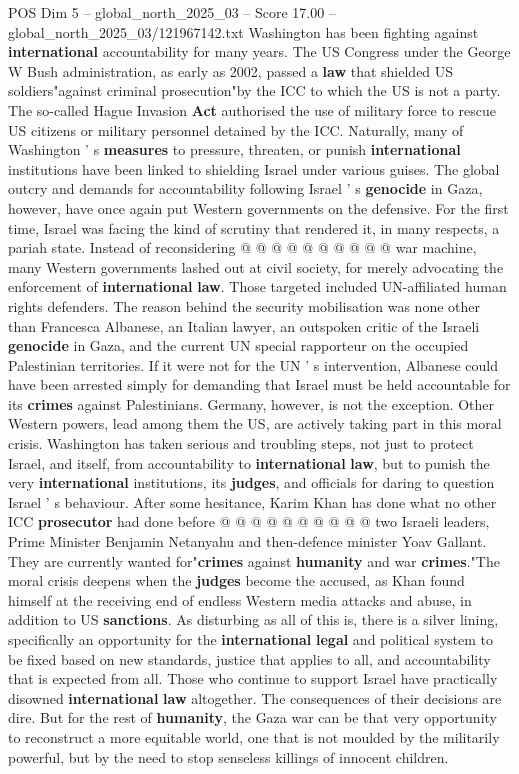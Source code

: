 \begin{textsample}{POS Dim 5 – global\_north\_2025\_03 – Score 17.00 – global\_north\_2025\_03/121967142.txt}
Washington has been fighting against \textbf{international} accountability for many years.
The US Congress under the George W Bush administration, as early as 2002, passed a \textbf{law} that shielded US soldiers"against criminal prosecution"by the ICC to which the US is not a party.
The so-called Hague Invasion \textbf{Act} authorised the use of military force to rescue US citizens or military personnel detained by the ICC.
Naturally, many of Washington ' s \textbf{measures} to pressure, threaten, or punish \textbf{international} institutions have been linked to shielding Israel under various guises.
The global outcry and demands for accountability following Israel ' s \textbf{genocide} in Gaza, however, have once again put Western governments on the defensive.
For the first time, Israel was facing the kind of scrutiny that rendered it, in many respects, a pariah state.
Instead of reconsidering @ @ @ @ @ @ @ @ @ @ war machine, many Western governments lashed out at civil society, for merely advocating the enforcement of \textbf{international} \textbf{law}.
Those targeted included UN-affiliated human rights defenders.
The reason behind the security mobilisation was none other than Francesca Albanese, an Italian lawyer, an outspoken critic of the Israeli \textbf{genocide} in Gaza, and the current UN special rapporteur on the occupied Palestinian territories.
If it were not for the UN ' s intervention, Albanese could have been arrested simply for demanding that Israel must be held accountable for its \textbf{crimes} against Palestinians.
Germany, however, is not the exception.
Other Western powers, lead among them the US, are actively taking part in this moral crisis.
Washington has taken serious and troubling steps, not just to protect Israel, and itself, from accountability to \textbf{international} \textbf{law}, but to punish the very \textbf{international} institutions, its \textbf{judges}, and officials for daring to question Israel ' s behaviour.
After some hesitance, Karim Khan has done what no other ICC \textbf{prosecutor} had done before @ @ @ @ @ @ @ @ @ @ two Israeli leaders, Prime Minister Benjamin Netanyahu and then-defence minister Yoav Gallant.
They are currently wanted for"\textbf{crimes} against \textbf{humanity} and war \textbf{crimes}."The moral crisis deepens when the \textbf{judges} become the accused, as Khan found himself at the receiving end of endless Western media attacks and abuse, in addition to US \textbf{sanctions}.
As disturbing as all of this is, there is a silver lining, specifically an opportunity for the \textbf{international} \textbf{legal} and political system to be fixed based on new standards, justice that applies to all, and accountability that is expected from all.
Those who continue to support Israel have practically disowned \textbf{international} \textbf{law} altogether.
The consequences of their decisions are dire.
But for the rest of \textbf{humanity}, the Gaza war can be that very opportunity to reconstruct a more equitable world, one that is not moulded by the militarily powerful, but by the need to stop senseless killings of innocent children.


\end{textsample}
